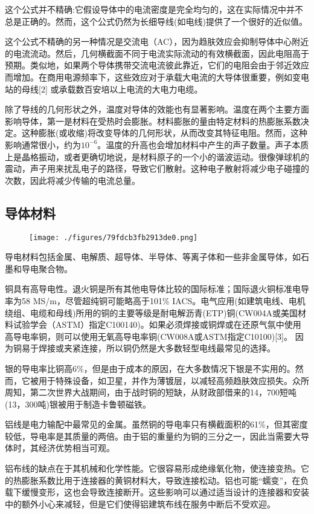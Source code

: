 这个公式并不精确:它假设导体中的电流密度是完全均匀的，这在实际情况中并不总是正确的。然而，这个公式仍然为长细导线(如电线)提供了一个很好的近似值。

这个公式不精确的另一种情况是交流电（AC），因为趋肤效应会抑制导体中心附近的电流流动。然后，几何横截面不同于电流实际流动的有效横截面，因此电阻高于预期。类似地，如果两个导体携带交流电流彼此靠近，它们的电阻会由于邻近效应而增加。在商用电源频率下，这些效应对于承载大电流的大导体很重要，例如变电站的母线[2] 或承载数百安培以上电流的大电力电缆。

除了导线的几何形状之外，温度对导体的效能也有显著影响。温度在两个主要方面影响导体，第一是材料在受热时会膨胀。材料膨胀的量由特定材料的热膨胀系数决定。这种膨胀(或收缩)将改变导体的几何形状，从而改变其特征电阻。然而，这种影响通常很小，约为$10^{-6}$。温度的升高也会增加材料中产生的声子数量。声子本质上是晶格振动，或者更确切地说，是材料原子的一个小的谐波运动。很像弹球机的震动，声子用来扰乱电子的路径，导致它们散射。这种电子散射将减少电子碰撞的次数，因此将减少传输的电流总量。

\subsection{导体材料}
\begin{figure}[ht]
\centering
\texttt{[image: ./figures/79fdcb3fb2913de0.png]}
\caption\label{fig_DDT_2}
\end{figure}

导电材料包括金属、电解质、超导体、半导体、等离子体和一些非金属导体，如石墨和导电聚合物。

铜具有高导电性。退火铜是所有其他电导体比较的国际标准；国际退火铜标准电导率为58 MS/m，尽管超纯铜可能略高于101\% IACS。电气应用(如建筑电线、电机绕组、电缆和母线)所用的铜的主要等级是耐电解沥青(ETP)铜(CW004A或美国材料试验学会（ASTM）指定C100140)。如果必须焊接或铜焊或在还原气氛中使用高导电率铜，则可以使用无氧高导电率铜(CW008A或ASTM指定C10100)[3]。 因为铜易于焊接或夹紧连接，所以铜仍然是大多数轻型电线最常见的选择。

银的导电率比铜高6\%，但是由于成本的原因，在大多数情况下银是不实用的。然而，它被用于特殊设备，如卫星，并作为薄镀层，以减轻高频趋肤效应损失。众所周知，第二次世界大战期间，由于战时铜的短缺，从财政部借来的14，700短吨(13，300吨)银被用于制造卡鲁顿磁铁。

铝线是电力输配中最常见的金属。虽然铜的导电率只有横截面积的61\%，但其密度较低，导电率是其质量的两倍。由于铝的重量约为铜的三分之一，因此当需要大导体时，其经济优势相当可观。

铝布线的缺点在于其机械和化学性能。它很容易形成绝缘氧化物，使连接变热。它的热膨胀系数比用于连接器的黄铜材料大，导致连接松动。铝也可能“蠕变”，在负载下缓慢变形，这也会导致连接断开。这些影响可以通过适当设计的连接器和安装中的额外小心来减轻，但是它们使得铝建筑布线在服务中断后不受欢迎。

